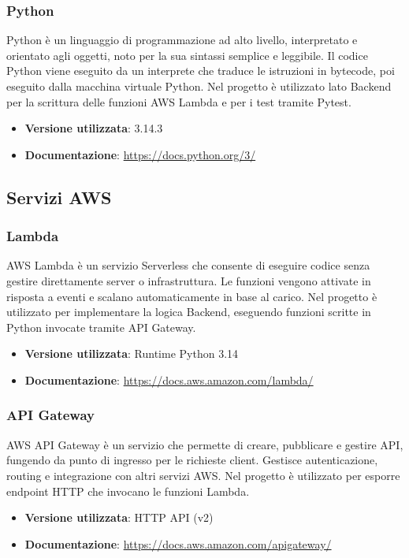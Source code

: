 \documentclass[a4paper,12pt]{article}
\begin{document}
\subsubsection{Python}
Python è un linguaggio di programmazione ad alto livello, interpretato e orientato agli oggetti, noto per la sua sintassi semplice e leggibile. Il codice Python viene eseguito da un interprete che traduce le istruzioni in bytecode, poi eseguito dalla macchina virtuale Python. Nel progetto è utilizzato lato Backend per la scrittura delle funzioni AWS Lambda e per i test tramite Pytest.
\begin{itemize}
    \item \textbf{Versione utilizzata}: 3.14.3
    \item \textbf{Documentazione}: \url{https://docs.python.org/3/}
\end{itemize}

\subsection{Servizi AWS} \label{subsec:aws}

\subsubsection{Lambda}
AWS Lambda è un servizio Serverless che consente di eseguire codice senza gestire direttamente server o infrastruttura. Le funzioni vengono attivate in risposta a eventi e scalano automaticamente in base al carico. Nel progetto è utilizzato per implementare la logica Backend, eseguendo funzioni scritte in Python invocate tramite API Gateway.
\begin{itemize}
    \item \textbf{Versione utilizzata}: Runtime Python 3.14
    \item \textbf{Documentazione}: \url{https://docs.aws.amazon.com/lambda/}
\end{itemize}

\subsubsection{API Gateway}
AWS API Gateway è un servizio che permette di creare, pubblicare e gestire API, fungendo da punto di ingresso per le richieste client. Gestisce autenticazione, routing e integrazione con altri servizi AWS. Nel progetto è utilizzato per esporre endpoint HTTP che invocano le funzioni Lambda.
\begin{itemize}
    \item \textbf{Versione utilizzata}: HTTP API (v2)
    \item \textbf{Documentazione}: \url{https://docs.aws.amazon.com/apigateway/}
\end{itemize}
\end{document}
